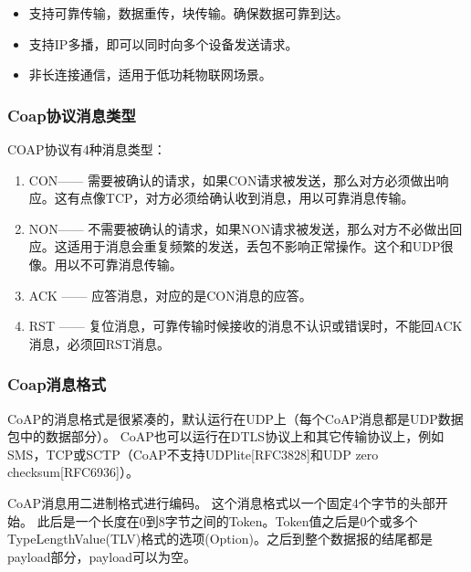 \documentclass[a4paper,12pt,english]{sphinxmanual}
\begin{document}
{{\begin{itemize}
\item {} 
\sphinxAtStartPar
支持可靠传输，数据重传，块传输。确保数据可靠到达。

\item {} 
\sphinxAtStartPar
支持IP多播，即可以同时向多个设备发送请求。

\item {} 
\sphinxAtStartPar
非长连接通信，适用于低功耗物联网场景。

\end{itemize}


\subsubsection{Coap协议消息类型}
\label{\detokenize{exp-esp32/coap:id3}}
\sphinxAtStartPar
COAP协议有4种消息类型：
\begin{enumerate}
%
\item {} 
\sphinxAtStartPar
CON—— 需要被确认的请求，如果CON请求被发送，那么对方必须做出响应。这有点像TCP，对方必须给确认收到消息，用以可靠消息传输。

\item {} 
\sphinxAtStartPar
NON—— 不需要被确认的请求，如果NON请求被发送，那么对方不必做出回应。这适用于消息会重复频繁的发送，丢包不影响正常操作。这个和UDP很像。用以不可靠消息传输。

\item {} 
\sphinxAtStartPar
ACK —— 应答消息，对应的是CON消息的应答。

\item {} 
\sphinxAtStartPar
RST —— 复位消息，可靠传输时候接收的消息不认识或错误时，不能回ACK消息，必须回RST消息。

\end{enumerate}


\subsubsection{Coap消息格式}
\label{\detokenize{exp-esp32/coap:id4}}
\sphinxAtStartPar
CoAP的消息格式是很紧凑的，默认运行在UDP上（每个CoAP消息都是UDP数据包中的数据部分）。
CoAP也可以运行在DTLS协议上和其它传输协议上，例如SMS，TCP或SCTP（CoAP不支持UDP\sphinxhyphen{}lite{[}RFC3828{]}和UDP zero checksum{[}RFC6936{]}）。

\sphinxAtStartPar
CoAP消息用二进制格式进行编码。 这个消息格式以一个固定4个字节的头部开始。
此后是一个长度在0到8字节之间的Token。Token值之后是0个或多个Type\sphinxhyphen{}Length\sphinxhyphen{}Value(TLV)格式的选项(Option)。之后到整个数据报的结尾都是payload部分，payload可以为空。

}}
\end{document}
